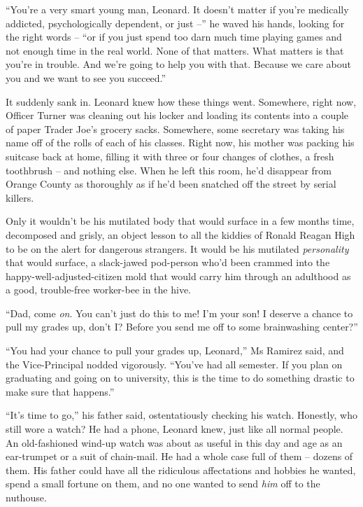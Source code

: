 ``You're a very smart young man, Leonard. It doesn't matter if
you're medically addicted, psychologically dependent, or just --''
he waved his hands, looking for the right words -- ``or if you just
spend too darn much time playing games and not enough time in the
real world. None of that matters. What matters is that you're in
trouble. And we're going to help you with that. Because we care
about you and we want to see you succeed.''

It suddenly sank in. Leonard knew how these things went. Somewhere,
right now, Officer Turner was cleaning out his locker and loading
its contents into a couple of paper Trader Joe's grocery sacks.
Somewhere, some secretary was taking his name off of the rolls of
each of his classes. Right now, his mother was packing his suitcase
back at home, filling it with three or four changes of clothes, a
fresh toothbrush -- and nothing else. When he left this room, he'd
disappear from Orange County as thoroughly as if he'd been snatched
off the street by serial killers.

Only it wouldn't be his mutilated body that would surface in a few
months time, decomposed and grisly, an object lesson to all the
kiddies of Ronald Reagan High to be on the alert for dangerous
strangers. It would be his mutilated \emph{personality} that would
surface, a slack-jawed pod-person who'd been crammed into the
happy-well-adjusted-citizen mold that would carry him through an
adulthood as a good, trouble-free worker-bee in the hive.

``Dad, come \emph{on}. You can't just do this to me! I'm your son! I
deserve a chance to pull my grades up, don't I? Before you send me
off to some brainwashing center?''

``You had your chance to pull your grades up, Leonard,'' Ms Ramirez
said, and the Vice-Principal nodded vigorously. ``You've had all
semester. If you plan on graduating and going on to university,
this is the time to do something drastic to make sure that
happens.''

``It's time to go,'' his father said, ostentatiously checking his
watch. Honestly, who still wore a watch? He had a phone, Leonard
knew, just like all normal people. An old-fashioned wind-up watch
was about as useful in this day and age as an ear-trumpet or a suit
of chain-mail. He had a whole case full of them -- dozens of them.
His father could have all the ridiculous affectations and hobbies
he wanted, spend a small fortune on them, and no one wanted to send
\emph{him} off to the nuthouse.

